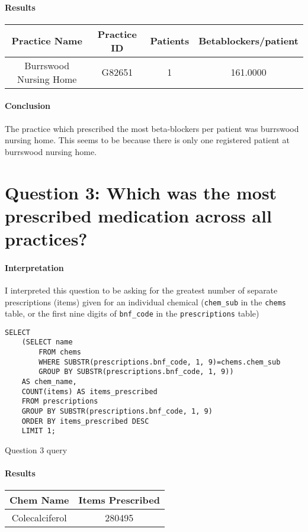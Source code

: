 \documentclass{report}
\begin{document}
\paragraph{Results}
\begin{center}
\begin{tabular}{ | c | c | c | c | }
\hline
Practice Name & Practice ID & Patients & Betablockers/patient \\
\hline
Burrswood Nursing Home & G82651 & 1 & 161.0000 \\
\hline
\end{tabular}
\end{center}

\paragraph{Conclusion}
The practice which prescribed the most beta-blockers per patient was burrswood nursing home. This seems to be because there is only one registered patient at burrswood nursing home.

\section{Question 3: Which was the most prescribed medication across all practices?}
\paragraph{Interpretation}
I interpreted this question to be asking for the greatest number of separate prescriptions (items) given for an individual chemical (\texttt{chem\_sub} in the \texttt{chems} table, or the first nine digits of \texttt{bnf\_code} in the \texttt{prescriptions} table)

\begin{listing}[H]
\begin{verbatim}
SELECT 
    (SELECT name 
        FROM chems 
        WHERE SUBSTR(prescriptions.bnf_code, 1, 9)=chems.chem_sub 
        GROUP BY SUBSTR(prescriptions.bnf_code, 1, 9)) 
    AS chem_name, 
    COUNT(items) AS items_prescribed 
    FROM prescriptions 
    GROUP BY SUBSTR(prescriptions.bnf_code, 1, 9) 
    ORDER BY items_prescribed DESC 
    LIMIT 1;
\end{verbatim}
\caption{Question 3 query}
\label{lst: Q3-1}
\end{listing}

\paragraph{Results}
\begin{center}
\begin{tabular}{ | c | c | }
\hline
Chem Name & Items Prescribed \\
\hline
Colecalciferol & 280495 \\
\hline
\end{tabular}
\end{center}
\end{document}
